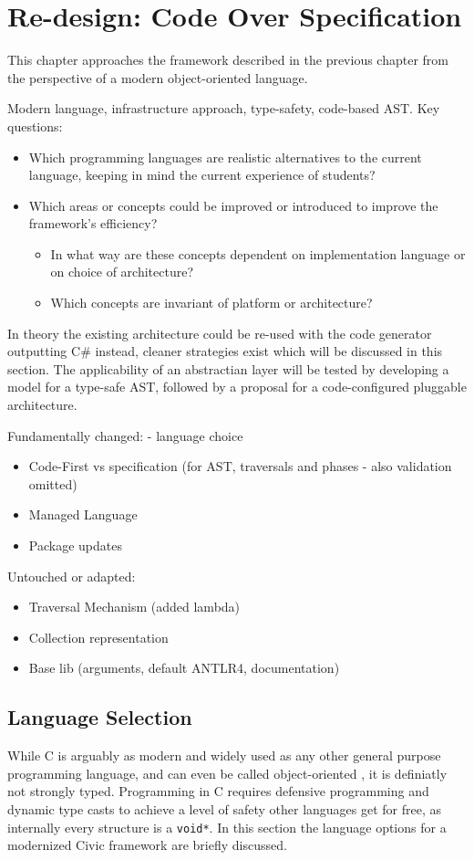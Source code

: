 \documentclass[twoside,openright]{uva-bachelor-thesis}
\newcommand{\code}[1]{\texttt{\footnotesize#1}}
\begin{document}
	
\chapter{Re-design: Code Over Specification}
	This chapter approaches the framework described in the previous chapter from the perspective of a modern object-oriented language.

	Modern language, infrastructure approach, type-safety, code-based AST. Key questions:
	\begin{itemize}
		\item Which programming languages are realistic alternatives to the current language, keeping in mind the current experience of students?
		\item Which areas or concepts could be improved or introduced to improve the framework's efficiency?
		\begin{itemize}
			\item In what way are these concepts dependent on implementation language or on choice of architecture?
			\item Which concepts are invariant of platform or architecture?
		\end{itemize}
	\end{itemize}
	
	In theory the existing architecture could be re-used with the code generator outputting C\# instead, cleaner strategies exist which will be discussed in this section. The applicability of an abstractian layer will be tested by developing a model for a type-safe AST, followed by a proposal for a code-configured pluggable architecture.
		
		Fundamentally changed:
		- language choice
		\begin{itemize}
			\item Code-First vs specification (for AST, traversals and phases - also validation omitted)
			\item Managed Language
			\item Package updates
		\end{itemize}
		Untouched or adapted:
		\begin{itemize}
			\item Traversal Mechanism (added lambda)
			\item Collection representation
			\item Base lib (arguments, default ANTLR4, documentation)
		\end{itemize}
	
	\section{Language Selection}
		While C is arguably as modern and widely used as any other general purpose programming language, and can even be called object-oriented \cite{book:schreiner}, it is definiatly not strongly typed. Programming in C requires defensive programming and dynamic type casts to achieve a level of safety other languages get for free, as internally every structure is a \code{void*}. In this section the language options for a modernized Civic framework are briefly discussed.
		
\end{document}
